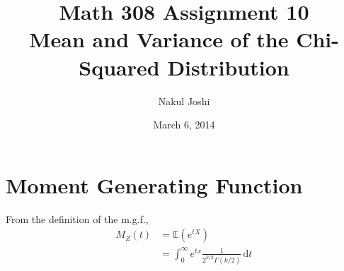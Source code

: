 \documentclass[twocolumn]{article}
\title{Math 308 Assignment 10\\Mean and Variance of the Chi-Squared Distribution}
\author{Nakul Joshi}
\date{March 6, 2014}
\newcommand{\ev}[1]{\mathbb{E}(#1)}
\newcommand{\rmd}{\mathrm{d}}
\newcommand{\intg}[4]{\int_{#1}^{#2} \! #3 \, \rmd#4}
\begin{document}
\maketitle

\section{Moment Generating Function}
From the definition of the m.g.f.,\begin{align*}
M_Z(t)&=\ev{e^{tX}}\\
&=\intg{0}{\infty}{
	e^{tx} \frac{1}{2^{k/2}\Gamma(k/2)}
}{t}
\end{align*}
\end{document}
